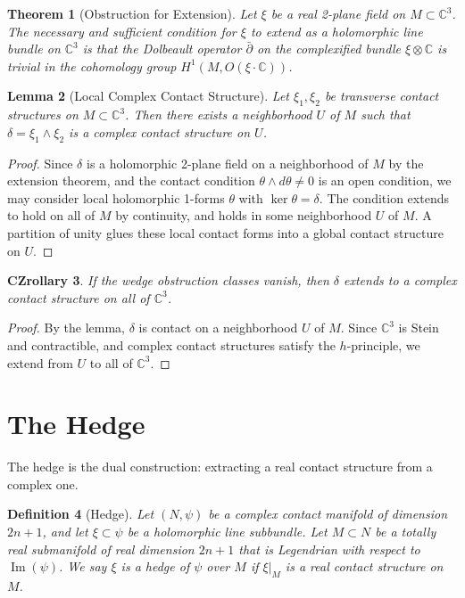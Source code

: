 \documentclass{amsart}
\newtheorem{theorem}{Theorem}
\newtheorem{definition}[theorem]{Definition}
\newtheorem{lemma}[theorem]{Lemma}
\newtheorem{corollary}[theorem]{CZrollary}
\newcommand{\C}{\mathbb{C}}
\begin{document}
\begin{theorem}[Obstruction for Extension]
Let $\xi$ be a real 2-plane field on $M \subset \C^3$. The necessary and sufficient condition for $\xi$ to extend as a holomorphic line bundle on $\C^3$ is that the Dolbeault operator $\bar\partial$ on the complexified bundle $\xi \otimes \C$ is trivial in the cohomology group $H^1(M, O(\xi \cdot \C))$.
\end{theorem}

\begin{lemma}[Local Complex Contact Structure]
Let $\xi_1, \xi_2$ be transverse contact structures on $M \subset \C^3$. Then there exists a neighborhood $U$ of $M$ such that $\delta = \xi_1 \wedge \xi_2$ is a complex contact structure on $U$.
\end{lemma}

\begin{proof}
Since $\delta$ is a holomorphic 2-plane field on a neighborhood of $M$ by the extension theorem, and the contact condition $\theta \wedge d\theta \neq 0$ is an open condition, we may consider local holomorphic 1-forms $\theta$ with $\ker\theta = \delta$. The condition extends to hold on all of $M$ by continuity, and holds in some neighborhood $U$ of $M$. A partition of unity glues these local contact forms into a global contact structure on $U$.
\end{proof}

\begin{corollary}
If the wedge obstruction classes vanish, then $\delta$ extends to a complex contact structure on all of $\C^3$.
\end{corollary}

\begin{proof}
By the lemma, $\delta$ is contact on a neighborhood $U$ of $M$. Since $\C^3$ is Stein and contractible, and complex contact structures satisfy the $h$-principle, we extend from $U$ to all of $\C^3$.
\end{proof}

\section{The Hedge}

The hedge is the dual construction: extracting a real contact structure from a complex one.

\begin{definition}[Hedge]
Let $(N, \psi)$ be a complex contact manifold of dimension $2n+1$, and let $\xi \subset \psi$ be a holomorphic line subbundle. Let $M \subset N$ be a totally real submanifold of real dimension $2n+1$ that is Legendrian with respect to $\operatorname{Im}(\psi)$. We say $\xi$ is a \emph{hedge} of $\psi$ over $M$ if $\xi|_M$ is a real contact structure on $M$.
\end{definition}
\end{document}
